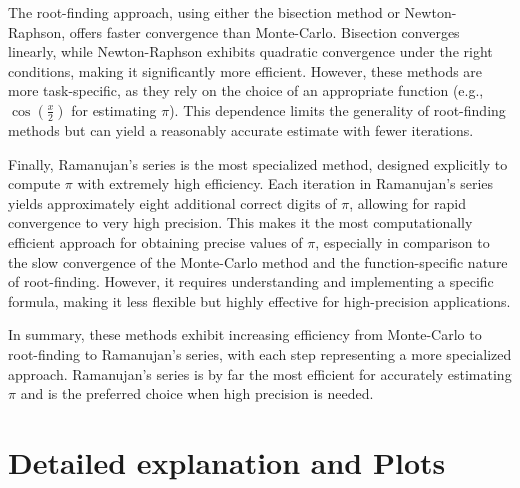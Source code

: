 \documentclass[hidelinks]{article}
\begin{document}
The root-finding approach, using either the bisection method or Newton-Raphson, offers faster convergence than Monte-Carlo. Bisection converges linearly, while Newton-Raphson exhibits quadratic convergence under the right conditions, making it significantly more efficient. However, these methods are more task-specific, as they rely on the choice of an appropriate function (e.g., \(\cos{\left(\frac{x}{2}\right)}\) for estimating \(\pi\)). This dependence limits the generality of root-finding methods but can yield a reasonably accurate estimate with fewer iterations.

Finally, Ramanujan's series is the most specialized method, designed explicitly to compute \(\pi\) with extremely high efficiency. Each iteration in Ramanujan's series yields approximately eight additional correct digits of \(\pi\), allowing for rapid convergence to very high precision. This makes it the most computationally efficient approach for obtaining precise values of \(\pi\), especially in comparison to the slow convergence of the Monte-Carlo method and the function-specific nature of root-finding. However, it requires understanding and implementing a specific formula, making it less flexible but highly effective for high-precision applications.

In summary, these methods exhibit increasing efficiency from Monte-Carlo to root-finding to Ramanujan’s series, with each step representing a more specialized approach. Ramanujan's series is by far the most efficient for accurately estimating \(\pi\) and is the preferred choice when high precision is needed.
%
\newpage
\appendix{} \label{appendix}
\section{Detailed explanation and Plots}
\end{document}
